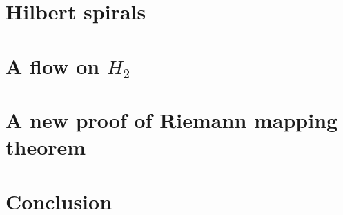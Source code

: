 \documentclass{article}
\begin{document}
\section{Hilbert spirals}\label{sec:space-filling}

\section{A flow on $H_2$}\label{sec:flow}

\section{A new proof of Riemann mapping theorem}\label{sec:riemann-mapping}

\section{Conclusion}\label{sec:conclusion}
\end{document}
